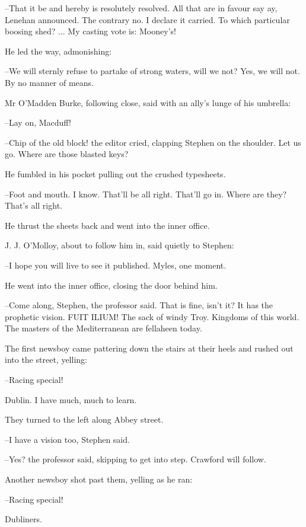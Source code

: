 --That it be and hereby is resolutely resolved. All that are in favour
say ay, Lenehan announced. The contrary no. I declare it carried. To which
particular boosing shed? ... My casting vote is: Mooney's!

He led the way, admonishing:

--We will sternly refuse to partake of strong waters, will we not? Yes,
we will not. By no manner of means.

Mr O'Madden Burke, following close, said with an ally's lunge of his
umbrella:

--Lay on, Macduff!

--Chip of the old block! the editor cried, clapping Stephen on the
shoulder. Let us go. Where are those blasted keys?

He fumbled in his pocket pulling out the crushed typesheets.

--Foot and mouth. I know. That'll be all right. That'll go in. Where are
they? That's all right.

He thrust the sheets back and went into the inner office.



J. J. O'Molloy, about to follow him in, said quietly to Stephen:

--I hope you will live to see it published. Myles, one moment.

He went into the inner office, closing the door behind him.

--Come along, Stephen, the professor said. That is fine, isn't it? It has
the prophetic vision. FUIT ILIUM! The sack of windy Troy. Kingdoms of this
world. The masters of the Mediterranean are fellaheen today.

The first newsboy came pattering down the stairs at their heels and
rushed out into the street, yelling:

--Racing special!

Dublin. I have much, much to learn.

They turned to the left along Abbey street.

--I have a vision too, Stephen said.

--Yes? the professor said, skipping to get into step. Crawford will
follow.

Another newsboy shot past them, yelling as he ran:

--Racing special!



Dubliners.

